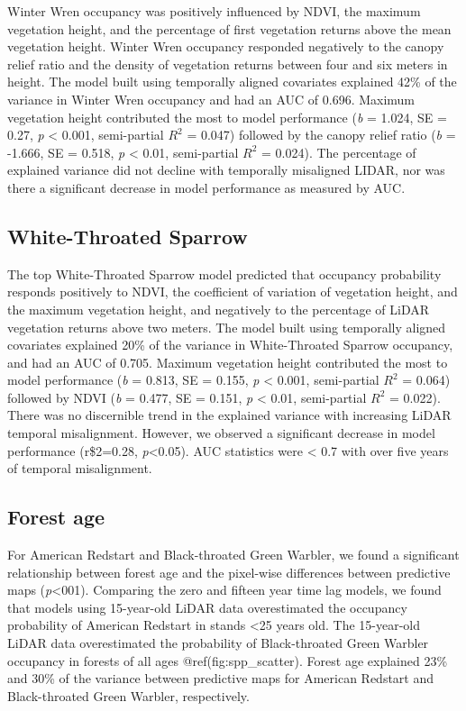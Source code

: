 \documentclass[
]{article}
\begin{document}
Winter Wren occupancy was positively influenced by NDVI, the maximum vegetation height, and the percentage of first vegetation returns above the mean vegetation height. Winter Wren occupancy responded negatively to the canopy relief ratio and the density of vegetation returns between four and six meters in height. The model built using temporally aligned covariates explained 42\% of the variance in Winter Wren occupancy and had an AUC of 0.696. Maximum vegetation height contributed the most to model performance (\emph{b} = 1.024, SE = 0.27, \emph{p} \textless{} 0.001, semi-partial \(R^2\) = 0.047) followed by the canopy relief ratio (\emph{b} = -1.666, SE = 0.518, \emph{p} \textless{} 0.01, semi-partial \(R^2\) = 0.024). The percentage of explained variance did not decline with temporally misaligned LIDAR, nor was there a significant decrease in model performance as measured by AUC.

\hypertarget{white-throated-sparrow}{%
\subsection{White-Throated Sparrow}\label{white-throated-sparrow}}

The top White-Throated Sparrow model predicted that occupancy probability responds positively to NDVI, the coefficient of variation of vegetation height, and the maximum vegetation height, and negatively to the percentage of LiDAR vegetation returns above two meters. The model built using temporally aligned covariates explained 20\% of the variance in White-Throated Sparrow occupancy, and had an AUC of 0.705. Maximum vegetation height contributed the most to model performance (\emph{b} = 0.813, SE = 0.155, \emph{p} \textless{} 0.001, semi-partial \(R^2\) = 0.064) followed by NDVI (\emph{b} = 0.477, SE = 0.151, \emph{p} \textless{} 0.01, semi-partial \(R^2\) = 0.022). There was no discernible trend in the explained variance with increasing LiDAR temporal misalignment. However, we observed a significant decrease in model performance (r\$2=0.28, \emph{p}\textless0.05). AUC statistics were \textless{} 0.7 with over five years of temporal misalignment.

\hypertarget{forest-age}{%
\subsection{Forest age}\label{forest-age}}

For American Redstart and Black-throated Green Warbler, we found a significant relationship between forest age and the pixel-wise differences between predictive maps (\emph{p}\textless001). Comparing the zero and fifteen year time lag models, we found that models using 15-year-old LiDAR data overestimated the occupancy probability of American Redstart in stands \textless25 years old. The 15-year-old LiDAR data overestimated the probability of Black-throated Green Warbler occupancy in forests of all ages @ref(fig:spp\_scatter). Forest age explained 23\% and 30\% of the variance between predictive maps for American Redstart and Black-throated Green Warbler, respectively.
\end{document}
